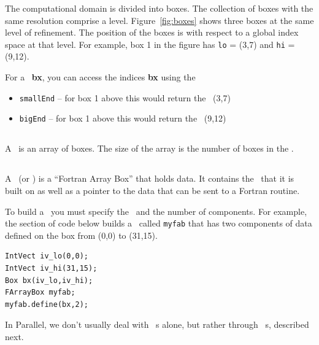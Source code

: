 The computational domain is divided into boxes.  The collection of
boxes with the same resolution comprise a level.
Figure~\ref{fig:boxes} shows three boxes at the same level of
refinement.  The position of the boxes is with respect to a global
index space at that level.  For example, box 1 in the figure has 
{\tt lo} = (3,7) and {\tt hi} = (9,12).  

For a \BoxType\ {\bf bx},
you can access the indices {\bf bx} using the 

\begin{itemize}
\item {\tt smallEnd}  -- for box 1 above this would return the \IntVect\ (3,7)
\item {\tt bigEnd} -- for box 1 above this would return the \IntVect\ (9,12)
\end{itemize}

\subsection{\BoxArray}

A \BoxArray\ is an array of boxes.   The size of the array is the 
number of boxes in the \BoxArray.

\subsection{\FArrayBox}

A \FArrayBox\ (or \Fab) is a ``Fortran Array Box'' that holds data.  It contains the
\BoxType\ that it is built on as well as a pointer to the data 
that can be sent to a Fortran routine.
 
To build a \Fab\ you must specify the \BoxType\ and the number of components.
For example, the section of code below builds a \Fab\ called {\tt myfab}
that has two components of data defined on the box from (0,0) to (31,15).

\begin{verbatim}
IntVect iv_lo(0,0);
IntVect iv_hi(31,15);
Box bx(iv_lo,iv_hi);
FArrayBox myfab;
myfab.define(bx,2);
\end{verbatim}

In Parallel, we don't usually deal with \Fab~s alone, but rather
through \MultiFab~s, described next.

\subsection{\MultiFab}

